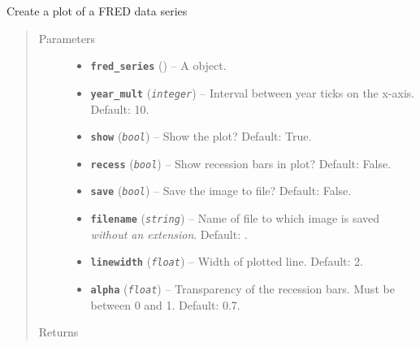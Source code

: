 \documentclass[letterpaper,10pt,english]{sphinxmanual}
\begin{document}

\begin{fulllineitems}
\label{additional_functions:fredpy.quickplot}
Create a plot of a FRED data series
\begin{quote}\begin{description}
\item[{Parameters}] \leavevmode\begin{itemize}
\item {} 
\textbf{\texttt{fred\_series}} ({\hyperref[series_class:fredpy.series]{}}) -- A  object.

\item {} 
\textbf{\texttt{year\_mult}} (\emph{\texttt{integer}}) -- Interval between year ticks on the x-axis. Default: 10.

\item {} 
\textbf{\texttt{show}} (\emph{\texttt{bool}}) -- Show the plot? Default: True.

\item {} 
\textbf{\texttt{recess}} (\emph{\texttt{bool}}) -- Show recession bars in plot? Default: False.

\item {} 
\textbf{\texttt{save}} (\emph{\texttt{bool}}) -- Save the image to file? Default: False.

\item {} 
\textbf{\texttt{filename}} (\emph{\texttt{string}}) -- Name of file to which image is saved \emph{without an extension}. Default: .

\item {} 
\textbf{\texttt{linewidth}} (\emph{\texttt{float}}) -- Width of plotted line. Default: 2.

\item {} 
\textbf{\texttt{alpha}} (\emph{\texttt{float}}) -- Transparency of the recession bars. Must be between 0 and 1. Default: 0.7.

\end{itemize}

\item[{Returns}] \leavevmode


\end{description}\end{quote}

\end{fulllineitems}
\end{document}
